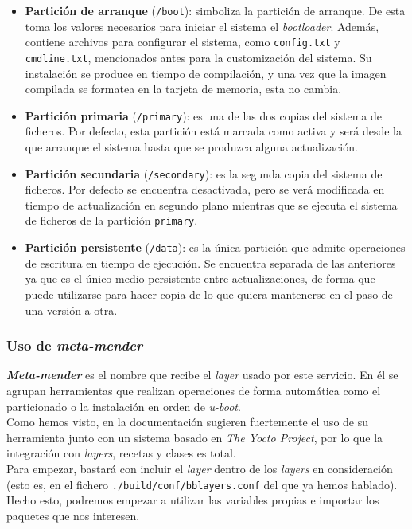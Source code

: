 \begin{itemize}
	\item \textbf{Partición de arranque} (\texttt{/boot}): simboliza la partición de arranque. De esta toma los valores necesarios para iniciar el sistema el \textit{bootloader}. Además, contiene archivos para configurar el sistema, como \texttt{config.txt} y \texttt{cmdline.txt}, mencionados antes para la customización del sistema. Su instalación se produce en tiempo de compilación, y una vez que la imagen compilada se formatea en la tarjeta de memoria, esta no cambia.
	\item \textbf{Partición primaria} (\texttt{/primary}): es una de las dos copias del sistema de ficheros. Por defecto, esta partición está marcada como activa y será desde la que arranque el sistema hasta que se produzca alguna actualización.
	\item \textbf{Partición secundaria} (\texttt{/secondary}): es la segunda copia del sistema de ficheros. Por defecto se encuentra desactivada, pero se verá modificada en tiempo de actualización en segundo plano mientras que se ejecuta el sistema de ficheros de la partición \texttt{primary}.
	\item \textbf{Partición persistente} (\texttt{/data}): es la única partición que admite operaciones de escritura en tiempo de ejecución. Se encuentra separada de las anteriores ya que es el único medio persistente entre actualizaciones, de forma que puede utilizarse para hacer copia de lo que quiera mantenerse en el paso de una versión a otra.
\end{itemize} 

\subsubsection{Uso de \textit{meta-mender}}

\textbf{\textit{Meta-mender}} es el nombre que recibe el \textit{layer} usado por este servicio. En él se agrupan herramientas que realizan operaciones de forma automática como el particionado o la instalación en orden de \textit{u-boot}.\\

Como hemos visto, en la documentación sugieren fuertemente el uso de su herramienta junto con un sistema basado en \textit{The Yocto Project}, por lo que la integración con \textit{layers}, recetas y clases es total.\\

Para empezar, bastará con incluir el \textit{layer} dentro de los \textit{layers} en consideración (esto es, en el fichero \texttt{./build/conf/bblayers.conf} del que ya hemos hablado). Hecho esto, podremos empezar a utilizar las variables propias e importar los paquetes que nos interesen.\\

